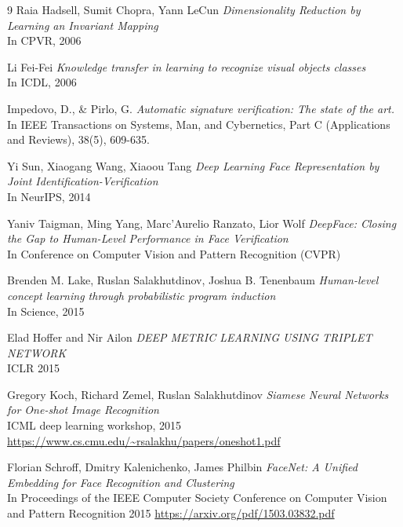 \begin{thebibliography}{9}
Raia Hadsell, Sumit Chopra, Yann LeCun
\textit{ Dimensionality Reduction by Learning an Invariant Mapping } \\
In CPVR, 2006

Li Fei-Fei
\textit{ Knowledge transfer in learning to recognize visual objects classes } \\
In ICDL, 2006

Impedovo, D., \& Pirlo, G.
\textit{ Automatic signature verification: The state of the art.  } \\
In IEEE Transactions on Systems, Man, and Cybernetics, Part C (Applications and Reviews), 38(5), 609-635.

Yi Sun, Xiaogang Wang, Xiaoou Tang
\textit{ Deep Learning Face Representation by Joint Identification-Verification } \\
In NeurIPS, 2014

Yaniv Taigman, Ming Yang, Marc'Aurelio Ranzato, Lior Wolf
\textit{ DeepFace: Closing the Gap to Human-Level Performance in Face Verification } \\
In Conference on Computer Vision and Pattern Recognition (CVPR)

Brenden M. Lake, Ruslan Salakhutdinov, Joshua B. Tenenbaum
\textit{ Human-level concept learning through probabilistic program induction } \\
In Science, 2015

Elad Hoffer and Nir Ailon
\textit{ DEEP METRIC LEARNING USING TRIPLET NETWORK } \\
ICLR 2015

Gregory Koch, Richard Zemel, Ruslan Salakhutdinov
\textit{ Siamese Neural Networks for One-shot Image Recognition } \\
ICML deep learning workshop, 2015 
\url{https://www.cs.cmu.edu/~rsalakhu/papers/oneshot1.pdf}

Florian Schroff, Dmitry Kalenichenko, James Philbin
\textit{ FaceNet: A Unified Embedding for Face Recognition and Clustering } \\
In Proceedings of the IEEE Computer Society Conference on Computer Vision and Pattern Recognition 2015
\url{https://arxiv.org/pdf/1503.03832.pdf}


\end{thebibliography}
